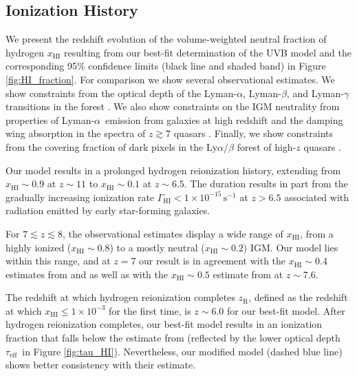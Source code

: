 \documentclass[twocolumn]{aastex62}
\newcommand\Lya{Lyman-$\alpha$}
\newcommand\taueff{$\tau_{\mathrm{eff}}$~}
\begin{document}
\subsection{Ionization History}
\label{sec:ionization_history}
 

We present the redshift evolution of the
volume-weighted neutral fraction of hydrogen $x_\mathrm{HI}$ resulting from our best-fit determination of the UVB model and the 
corresponding 95\% confidence limits (black line and shaded band) in Figure \ref{fig:HI_fraction}.
For comparison we show several observational estimates. We show
constraints from
the optical depth of the Lyman-$\alpha$, Lyman-$\beta$, and  Lyman-$\gamma$ transitions in the forest \citep{Fan+2006}.
We also show constraints on the IGM neutrality from
properties of \Lya\ emission from galaxies 
at high redshift \citep{Hoag+2019, Mason+2018, Mason+2019} and
 the damping wing absorption 
 in the spectra of $z\gtrsim 7$ quasars \citep{Greig+2017, Greig+2019, jung2020, Yang+2020a,
Wang+2020}.
Finally, we show constraints from the
covering fraction of dark pixels in the Ly$\alpha/\beta$ forest of high-$z$ quasars \citep{McGreer+2011, McGreer+2015}. 

Our model results in a prolonged hydrogen reionization history, extending
from $x_\mathrm{HI} \sim 0.9  $ at $z\sim 11$ to $x_\mathrm{HI} \sim 0.1 $ at $z\sim 6.5$.
The duration results in part from
the gradually increasing ionization rate $\Gamma_\mathrm{HI} < 1\times 10^{-15}\, \mathrm{s^{-1}}$ at $z>6.5$
associated with radiation emitted by early star-forming galaxies. 
 
For $7 \lesssim z \lesssim 8$, the observational estimates display a wide range of $x_\mathrm{HI}$, from a highly ionized ($x_\mathrm{HI} \sim 0.8$) to a mostly neutral 
($x_\mathrm{HI} \sim 0.2$) IGM. Our model lies within this range,
and at $z=7$ our result is in agreement with the $x_\mathrm{HI}\sim 0.4$ estimates from \cite{Greig+2017} and
\cite{Yang+2020a} as well as with the $x_\mathrm{HI}\sim 0.5$ estimate from \cite{jung2020} at $z\sim 7.6$.

The redshift at which hydrogen reionization completes $z_\mathrm{R}$,
defined as the redshift at which $x_\mathrm{HI} \leq 1 \times 10^{-3}$ for the first time,
is $z\sim 6.0$ for 
our best-fit model. After hydrogen reionization completes,
our best-fit model results in an ionization fraction that
falls below the estimate from \cite{Fan+2006} (reflected by the lower 
optical depth \taueff in Figure \ref{fig:tau_HI}).
Nevertheless, our modified model (dashed blue line) shows better consistency with their estimate.
\end{document}
